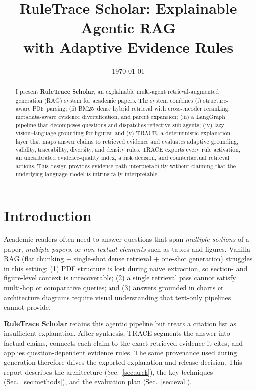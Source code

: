 \documentclass[11pt]{article}
\title{\textbf{RuleTrace Scholar}: Explainable Agentic RAG\\ with Adaptive Evidence Rules}
\author{}
\date{\today}
\begin{document}
\maketitle
\vspace{-1.2em}

\begin{abstract}
\noindent I present \textbf{RuleTrace Scholar}, an explainable multi-agent retrieval-augmented generation (RAG) system for academic papers. The system combines (i) structure-aware PDF parsing; (ii) BM25--dense hybrid retrieval with cross-encoder reranking, metadata-aware evidence diversification, and parent expansion; (iii) a LangGraph pipeline that decomposes questions and dispatches reflective sub-agents; (iv) lazy vision--language grounding for figures; and (v) TRACE, a deterministic explanation layer that maps answer claims to retrieved evidence and evaluates adaptive grounding, validity, traceability, diversity, and density rules. TRACE exports every rule activation, an uncalibrated evidence-quality index, a risk decision, and counterfactual retrieval actions. This design provides evidence-path interpretability without claiming that the underlying language model is intrinsically interpretable.
\end{abstract}

\vspace{-0.6em}
\section{Introduction}
\vspace{-0.3em}
Academic readers often need to answer questions that span \emph{multiple sections} of a paper, \emph{multiple papers}, or \emph{non-textual elements} such as tables and figures. Vanilla RAG (flat chunking + single-shot dense retrieval + one-shot generation) struggles in this setting: (1) PDF structure is lost during naive extraction, so section- and figure-level context is unrecoverable; (2) a single retrieval pass cannot satisfy multi-hop or comparative queries; and (3) answers grounded in charts or architecture diagrams require visual understanding that text-only pipelines cannot provide.

\textbf{RuleTrace Scholar} retains this agentic pipeline but treats a citation list as insufficient explanation. After synthesis, TRACE segments the answer into factual claims, connects each claim to the exact retrieved evidence it cites, and applies question-dependent evidence rules. The same provenance used during generation therefore drives the exported explanation and release decision. This report describes the architecture (Sec.~\ref{sec:arch}), the key techniques (Sec.~\ref{sec:methods}), and the evaluation plan (Sec.~\ref{sec:eval}).
\end{document}
